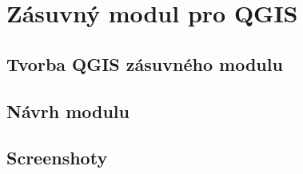 \chapter{Zásuvný modul pro QGIS}
\label{6-plugin}

\section{Tvorba QGIS zásuvného modulu}

\section{Návrh modulu}

\section{Screenshoty} %
